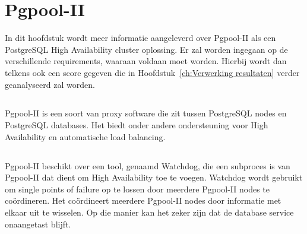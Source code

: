 
\chapter{Pgpool-II}
\label{ch:Pgpool-II}

In dit hoofdstuk wordt meer informatie aangeleverd over Pgpool-II als een PostgreSQL High Availability cluster oplossing. Er zal worden ingegaan op de verschillende requirements, waaraan voldaan moet worden. Hierbij wordt dan telkens ook een score gegeven die in Hoofdstuk~\ref{ch:Verwerking resultaten} verder geanalyseerd zal worden.

\section{}
\label{sec:Inleiding tot Pgpool-II}

Pgpool-II is een soort van proxy software die zit tussen PostgreSQL nodes en PostgreSQL databases. Het biedt onder andere ondersteuning voor High Availability en automatische load balancing.

\section{}
\label{sec:Requirements}

\subsection{}
\label{subsec:Must have}


\subsubsection{}
\label{subsubsec:Ondersteuning van replicatie}

Pgpool-II beschikt over een tool, genaamd Watchdog, die een subproces is van Pgpool-II dat dient om High Availability toe te voegen. Watchdog wordt gebruikt om single points of failure op te lossen door meerdere Pgpool-II nodes te coördineren. Het coördineert meerdere Pgpool-II nodes door informatie met elkaar uit te wisselen. Op die manier kan het zeker zijn dat de database service onaangetast blijft.

